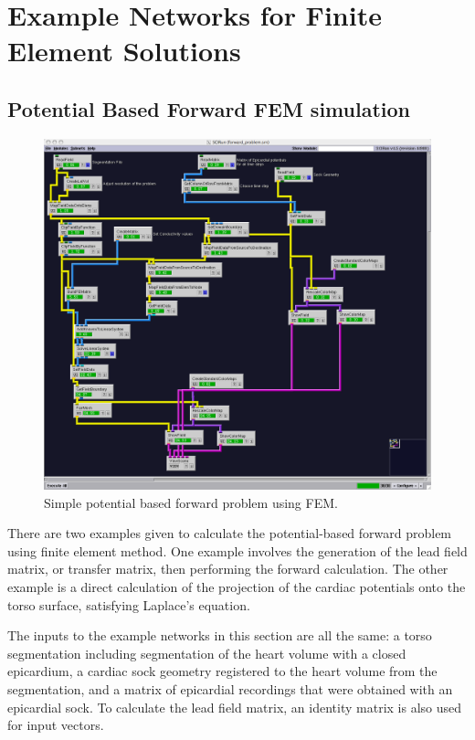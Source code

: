 \section{Example Networks for Finite Element Solutions}

\subsection{Potential Based Forward FEM simulation}

\label{sec:pot_for_fem}
\begin{figure}[H]
\begin{center}
\includegraphics[trim = 5mm 0mm 50mm 0mm, clip, width=\textwidth]{ECGToolkitGuide_figures/potential_forward_fem.png}
\caption{Simple potential based forward problem using FEM.}
\label{fig:pot_for_fem}
\end{center}
\end{figure}

\newpage

There are two examples given to calculate the potential-based forward problem using finite element method. One example involves the generation of the lead field matrix, or transfer matrix, then performing the forward calculation. The other example is a direct calculation of the projection of the cardiac potentials onto the torso surface, satisfying Laplace's equation.


The inputs to the example networks in this section are all the same: a torso segmentation including segmentation of the heart volume with a closed epicardium, a cardiac sock geometry registered to the heart volume from the segmentation, and a matrix of epicardial recordings that were obtained with an epicardial sock. To calculate the lead field matrix, an identity matrix is also used for input vectors.


